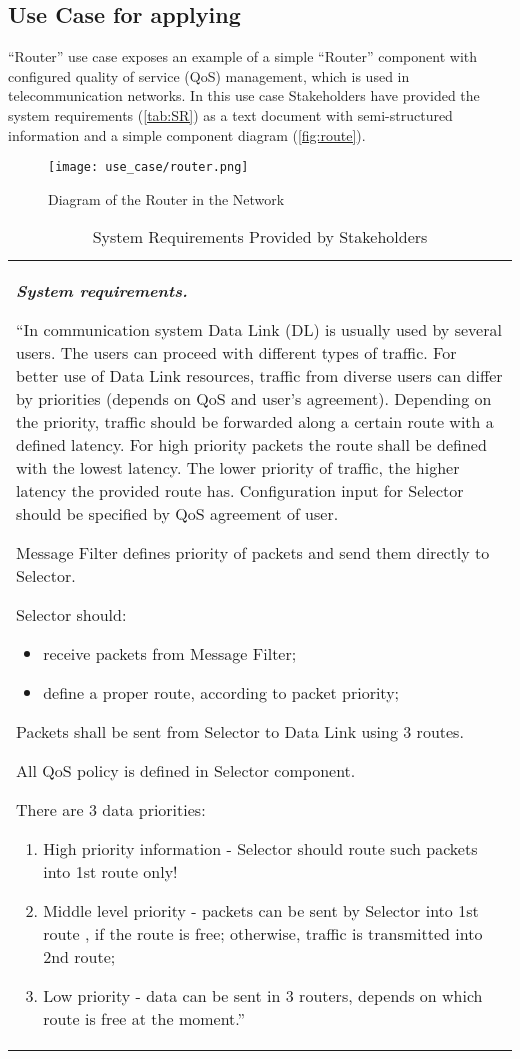 \subsection{Use Case for applying \cbc}
\label{sec:usecase} 

``Router'' use case exposes an example of a simple ``Router'' component with configured quality of service (QoS) management, which is used in telecommunication networks. In this use case Stakeholders have provided the system requirements (\autoref{tab:SR}) as a text document with semi-structured information and a simple component diagram (\autoref{fig:route}). 
\begin{figure}[!t]
\centering
\texttt{[image: use\_case/router.png]}
\caption{Diagram of the Router in the Network}
\label{fig:route}
\end{figure}

\begin{table}
	\centering
		\begin{tabular}{p{8cm}}
\small
\begin{center}
\textbf{\textit{System requirements.}}
\end{center}
``In communication system Data Link (DL) is usually used by several users. The users can proceed with different types of traffic. For better use of Data Link resources, traffic from diverse users can differ by priorities (depends on QoS and user's agreement). Depending on the priority, traffic should be forwarded along a certain route with a defined latency. For high priority packets the route shall be defined with the lowest latency. The lower priority of traffic, the higher latency the provided route has. Configuration input for Selector should be specified by QoS agreement of user.

Message Filter defines priority of packets and send them directly to Selector. 

Selector should:
\begin{itemize}
	\item receive packets from Message Filter;
  \item define a proper route, according to packet priority;
\end{itemize}

Packets shall be sent from Selector to Data Link using 3 routes.

All QoS policy is defined in Selector component. 

There are 3 data priorities: 
\begin{enumerate}
	\item High priority information - Selector should route such packets into 1st route only! 
  \item	Middle level priority - packets can be sent by Selector into 1st route , if the route is free; otherwise, traffic is transmitted into 2nd route;
  \item	Low priority - data can be sent in 3 routers, depends on which route is free at the moment.''
\end{enumerate}
\end{tabular}
	\caption{System Requirements Provided by Stakeholders}
	\label{tab:SR}
\end{table}

